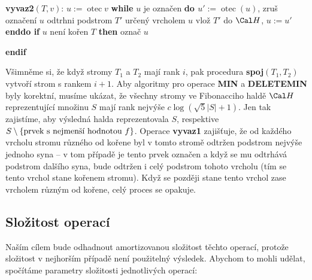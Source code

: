 \documentclass[a4paper,12pt]{article}
\DeclareMathOperator*{\otec}{otec}
\begin{document}
{\bf vyvaz2$(T,v)$}:\newline 
$u:=\otec v$\newline 
{\bf while} $u$ je označen {\bf do\newline 
\phantom{{\rm ---}}$u':=\otec(u)$}, zruš označení $u$\newline 
\phantom{---}odtrhni podstrom $T'$ určený vrcholem $u$\newline 
\phantom{---}vlož $T'$ do $\Cal H$, $u:=u'$\newline 
{\bf enddo\newline 
if} $u$ není kořen $T$ {\bf then} označ $u$ {\bf endif

}
Všimněme si, že když stromy $T_1$ a $T_2$ mají rank 
$i$, pak procedura {\bf spoj$(T_1,T_2)$} vytvoří strom s rankem 
$i+1$.  Aby algoritmy pro operace {\bf MIN} a {\bf DELETEMIN} byly 
korektní, musíme ukázat, že všechny stromy ve 
Fibonacciho haldě $\Cal H$ reprezentující množinu $
S$ mají rank 
nejvýše $c\log(\sqrt 5|S|+1)$. Jen tak zajistíme, aby výsledná 
halda reprezentovala $S$, res\-pektive 
$S\setminus \{\text{\rm prvek s nejmenší hodnotou }f\}$.  Operace {\bf vyvaz1 }
zajišťuje, že od každého vrcholu stromu různého 
od kořene byl v tomto stromě odtržen podstrom nejvýše 
jednoho syna -- v tom případě je tento prvek označen a 
když se mu odtrhává podstrom dalšího syna, bude odtržen 
i celý podstrom tohoto vrcholu (tím se tento vrchol stane kořenem 
stromu).  Když se později stane tento vrchol zase 
vrcholem různým od kořene, celý proces se 
opakuje. 

\subsection{
Složitost operací
}

Naším cílem bude odhadnout amortizovanou složitost těchto 
operací, protože složitost v nejhorším případě není 
použitelný výsledek.  Abychom to mohli udělat, spočítáme parametry 
složitosti jednotlivých operací:  
\end{document}
